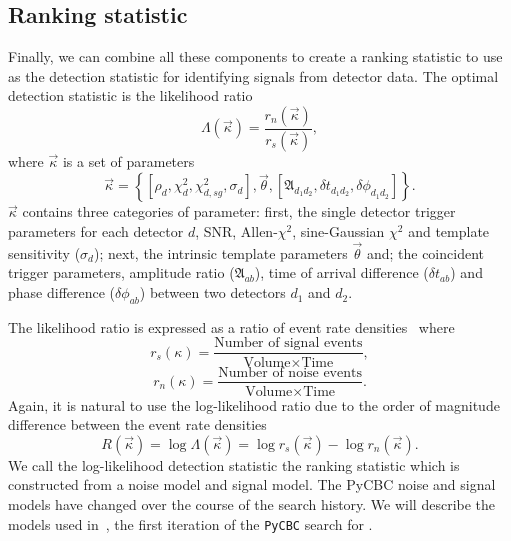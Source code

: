 \subsection{\label{2:sec:ranking-statistic}Ranking statistic}

Finally, we can combine all these components to create a ranking statistic to use as the detection statistic for identifying \gwadj signals from \gwadj detector data. The optimal detection statistic is the likelihood ratio~\cite{Biswas:2012}
%
\begin{equation}
    \Lambda(\vec{\kappa}) = \frac{r_{n}(\vec{\kappa})}{r_{s}(\vec{\kappa})},
\end{equation}
%
where $\vec{\kappa}$ is a set of parameters
%
\begin{equation}
    \vec{\kappa} = \left\{ \left[\rho_{d}, \chi^{2}_{d}, \chi^{2}_{d, sg}, \sigma_{d}\right], \vec{\theta}, \left[\mathfrak{A}_{d_{1}d_{2}}, \delta t_{d_{1}d_{2}}, \delta\phi_{d_{1}d_{2}}\right] \right\}.
\end{equation}
%
$\vec{\kappa}$ contains three categories of parameter: first, the single detector trigger parameters for each detector $d$, SNR, Allen-$\chi^{2}$, sine-Gaussian $\chi^{2}$ and template sensitivity ($\sigma_{d}$); next, the intrinsic template parameters $\vec{\theta}$ and; the coincident trigger parameters, amplitude ratio ($\mathfrak{A}_{ab}$), time of arrival difference ($\delta t_{ab}$) and phase difference ($\delta \phi_{ab}$) between two detectors $d_{1}$ and $d_{2}$.

The likelihood ratio is expressed as a ratio of event rate densities~\cite{PyCBC_global:2020} where
%
\begin{equation}
    r_{s}(\kappa) = \frac{\text{Number of signal events}}{\text{Volume} \times \text{Time}},
\end{equation}
%
\begin{equation}
    r_{n}(\kappa) = \frac{\text{Number of noise events}}{\text{Volume} \times \text{Time}}.
\end{equation}
%
Again, it is natural to use the log-likelihood ratio due to the order of magnitude difference between the event rate densities
%
\begin{equation}
    R(\vec{\kappa}) = \log \Lambda(\vec{\kappa}) = \log r_{s}(\vec{\kappa}) - \log r_{n}(\vec{\kappa}).
\end{equation}
%
We call the log-likelihood detection statistic the ranking statistic which is constructed from a noise model and signal model. The PyCBC noise and signal models have changed over the course of the \gwadj search history. We will describe the models used in~\cite{PyCBC:2016}, the first iteration of the \texttt{PyCBC} search for \cbcs.

